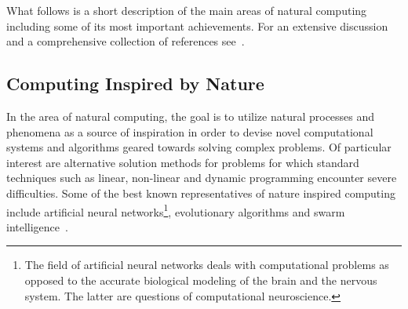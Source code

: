 	What follows is a short description of the main areas of natural computing including some of its most important achievements. For an extensive discussion and a comprehensive collection of references see~\cite{de2007fundamentals}.

	\FloatBarrier

	\subsection{Computing Inspired by Nature}

		In the area of natural computing, the goal is to utilize natural processes and phenomena as a source of inspiration in order to devise novel computational systems and algorithms geared towards solving complex problems. Of particular interest are alternative solution methods for problems for which standard techniques such as linear, non-linear and dynamic programming encounter severe difficulties. Some of the best known representatives of nature inspired computing include artificial neural networks\footnote{The field of artificial neural networks deals with computational problems as opposed to the accurate biological modeling of the brain and the nervous system. The latter are questions of computational neuroscience.}, evolutionary algorithms and swarm intelligence~\cite{de2007fundamentals}.

